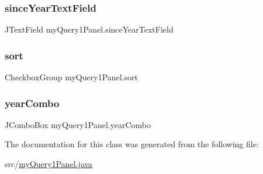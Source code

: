 \hypertarget{classmy_query1_panel_a60b95255f8c6ffeb063ca97c79206c49}{}\label{classmy_query1_panel_a60b95255f8c6ffeb063ca97c79206c49} 
\subsubsection{\texorpdfstring{since\+Year\+Text\+Field}{sinceYearTextField}}
{\footnotesize\ttfamily J\+Text\+Field my\+Query1\+Panel.\+since\+Year\+Text\+Field\hspace{0.3cm}{\ttfamily [protected]}}

\hypertarget{classmy_query1_panel_a5ae5e5e6cfc109b6a15ac6811604a5c1}{}\label{classmy_query1_panel_a5ae5e5e6cfc109b6a15ac6811604a5c1} 
\subsubsection{\texorpdfstring{sort}{sort}}
{\footnotesize\ttfamily Checkbox\+Group my\+Query1\+Panel.\+sort\hspace{0.3cm}{\ttfamily [protected]}}

\hypertarget{classmy_query1_panel_ac662f986c33598e85559ac3d93f634b0}{}\label{classmy_query1_panel_ac662f986c33598e85559ac3d93f634b0} 
\subsubsection{\texorpdfstring{year\+Combo}{yearCombo}}
{\footnotesize\ttfamily J\+Combo\+Box my\+Query1\+Panel.\+year\+Combo\hspace{0.3cm}{\ttfamily [protected]}}



The documentation for this class was generated from the following file\+:\begin{DoxyCompactItemize}
\item 
src/\hyperlink{my_query1_panel_8java}{my\+Query1\+Panel.\+java}\end{DoxyCompactItemize}
